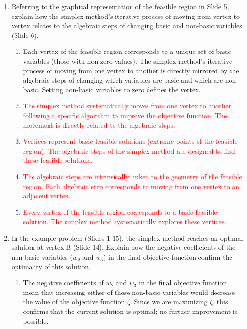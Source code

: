 \documentclass{article}%
\newcommand{\incorrect}[1]{\textcolor{red}{#1}}
\begin{document}
\begin{enumerate}
\begin{enumerate}
\begin{enumerate}
\item \incorrect{Similar to options C and D, slack variables are not directly considered in the maximum coefficient rule.}%
\end{enumerate}%
\vspace{0.5em}%
\item Referring to the graphical representation of the feasible region in Slide 5, explain how the simplex method's iterative process of moving from vertex to vertex relates to the algebraic steps of changing basic and non-basic variables (Slide 6).%
\begin{enumerate}%
\item Each vertex of the feasible region corresponds to a unique set of basic variables (those with non-zero values).  The simplex method's iterative process of moving from one vertex to another is directly mirrored by the algebraic steps of changing which variables are basic and which are non-basic.  Setting non-basic variables to zero defines the vertex.%
\item \incorrect{The simplex method systematically moves from one vertex to another, following a specific algorithm to improve the objective function.  The movement is directly related to the algebraic steps.}%
\item \incorrect{Vertices represent basic feasible solutions (extreme points of the feasible region). The algebraic steps of the simplex method are designed to find these feasible solutions.}%
\item \incorrect{The algebraic steps are intrinsically linked to the geometry of the feasible region. Each algebraic step corresponds to moving from one vertex to an adjacent vertex.}%
\item \incorrect{Every vertex of the feasible region corresponds to a basic feasible solution. The simplex method systematically explores these vertices.}%
\end{enumerate}%
\vspace{0.5em}%
\item In the example problem (Slides 1-15), the simplex method reaches an optimal solution at vertex B (Slide 14).  Explain how the negative coefficients of the non-basic variables ($w_2$ and $w_3$) in the final objective function confirm the optimality of this solution.%
\begin{enumerate}%
\item The negative coefficients of $w_2$ and $w_3$ in the final objective function mean that increasing either of these non-basic variables would decrease the value of the objective function $\zeta$. Since we are maximizing $\zeta$, this confirms that the current solution is optimal; no further improvement is possible.%

\end{enumerate}
\end{enumerate}
\end{enumerate}
\end{document}
